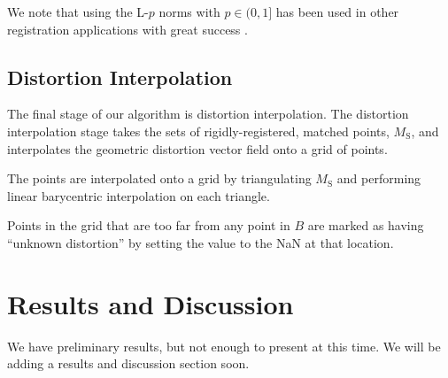 \documentclass[12pt]{article}
\begin{document}
We note that using the L-$p$ norms with $p \in (0, 1]$ has been used in other registration applications with great success \cite{bouaziz2013}.  

\subsection{Distortion Interpolation}

The final stage of our algorithm is distortion interpolation.  The distortion interpolation stage takes the sets of rigidly-registered, matched points, $M_\textrm{S}$, and interpolates the geometric distortion vector field onto a grid of points.

The points are interpolated onto a grid by triangulating $M_\textrm{S}$ and performing linear barycentric interpolation on each triangle.

Points in the grid that are too far from any point in $B$ are marked as having ``unknown distortion'' by setting the value to the NaN at that location.

\section{Results and Discussion}

We have preliminary results, but not enough to present at this time.  We will be adding a results and discussion section soon.



\end{document}
